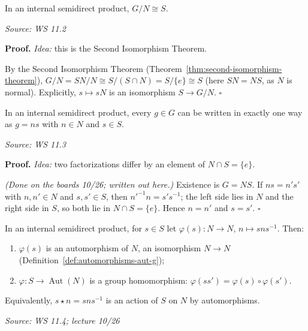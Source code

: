 \documentclass[11pt]{report}
\renewenvironment{proof}[1][Proof]{\noindent\textbf{#1.} }{\hfill$\square$\par\vspace{5pt}}
\newcommand{\srcline}[1]{\par\hfill{\footnotesize\textit{Source: #1}}}
\begin{document}
\begin{propbox}\label{prop:semidirect-quotient}
In an internal semidirect product, $G/N \cong S$.
\srcline{WS 11.2}
\end{propbox}

\begin{proof}
\textit{Idea:} this is the Second Isomorphism Theorem.\par
By the Second Isomorphism Theorem (Theorem~\ref{thm:second-isomorphism-theorem}), $G/N = SN/N \cong S/(S \cap N) = S/\{e\} \cong S$ (here $SN = NS$, as $N$ is normal). Explicitly, $s \mapsto sN$ is an isomorphism $S \to G/N$.
\end{proof}

\begin{propbox}[{Unique Factorization $g = ns$}]\label{prop:semidirect-unique-factorization}
In an internal semidirect product, every $g \in G$ can be written in exactly one way as $g = ns$ with $n \in N$ and $s \in S$.
\srcline{WS 11.3}
\end{propbox}

\begin{proof}
\textit{Idea:} two factorizations differ by an element of $N \cap S = \{e\}$.\par
\textit{(Done on the boards 10/26; written out here.)} Existence is $G = NS$. If $ns = n's'$ with $n, n' \in N$ and $s, s' \in S$, then $n'^{-1}n = s's^{-1}$; the left side lies in $N$ and the right side in $S$, so both lie in $N \cap S = \{e\}$. Hence $n = n'$ and $s = s'$.
\end{proof}

\begin{propbox}\label{prop:semidirect-action}
In an internal semidirect product, for $s \in S$ let $\varphi(s): N \to N$, $n \mapsto sns^{-1}$. Then:
\begin{enumerate}
    \item $\varphi(s)$ is an automorphism of $N$, an isomorphism $N \to N$ (Definition~\ref{def:automorphisms-aut-g});
    \item $\varphi: S \to \operatorname{Aut}(N)$ is a group homomorphism: $\varphi(ss') = \varphi(s) \circ \varphi(s')$.
\end{enumerate}
Equivalently, $s \star n = sns^{-1}$ is an action of $S$ on $N$ by automorphisms.
\srcline{WS 11.4; lecture 10/26}
\end{propbox}
\end{document}
